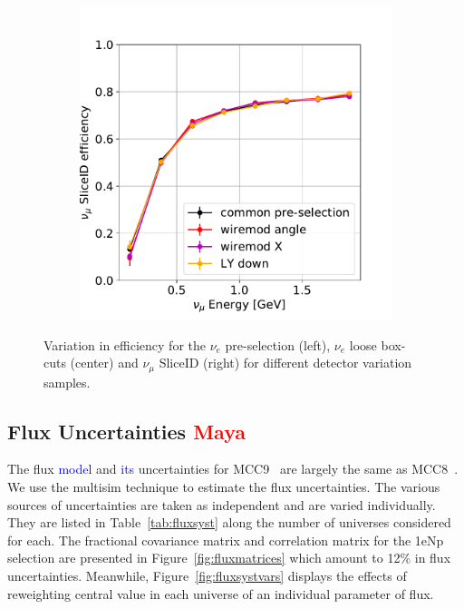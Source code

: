 \documentclass[a4paper]{article}
\begin{document}
\begin{figure}[H]
\begin{center}
\begin{subfigure}[b]{0.3\textwidth}
    \end{subfigure}
    \begin{subfigure}[b]{0.3\textwidth}
    \centering
    \includegraphics[width=1.00\textwidth]{detsys/nu_e01162020_numu_slice_eff.pdf}
    \end{subfigure}
\caption{\label{fig:detsys:dedx:eLEElow}Variation in efficiency for the $\nu_e$ pre-selection (left), $\nu_e$ loose box-cuts (center) and $\nu_{\mu}$ SliceID (right) for different detector variation samples.}
\end{center}
\end{figure}

\subsection{Flux Uncertainties \textcolor{red}{Maya}}
The flux \textcolor{blue}{model} and \textcolor{blue}{its} uncertainties for MCC9~\cite{bib:fluxmcc9,bib:fluxtechnote} are largely the same as MCC8~\cite{bib:fluxtechnote}. We use the multisim technique to estimate the flux uncertainties. The various sources of uncertainties are taken as independent and are varied individually. They are listed in Table~\ref{tab:fluxsyst} along the number of universes considered for each. The fractional covariance matrix and correlation matrix for the 1eNp selection are presented in Figure~\ref{fig:fluxmatrices} which amount to 12\% in flux uncertainties. Meanwhile, Figure~\ref{fig:fluxsystvars} displays the effects of reweighting central value in each universe of an individual parameter of flux.
\end{document}

